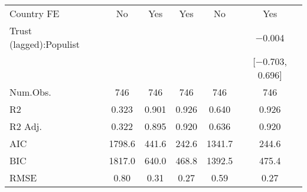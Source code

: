 \begin{table}
\begin{tabular}[t]{lccccc}
Country FE & No & Yes & Yes & No & Yes\\
Trust (lagged):Populist &  &  &  &  & \num{-0.004}\\
 &  &  &  &  & {}[\num{-0.703}, \num{0.696}]\\
\midrule
Num.Obs. & \num{746} & \num{746} & \num{746} & \num{746} & \num{746}\\
R2 & \num{0.323} & \num{0.901} & \num{0.926} & \num{0.640} & \num{0.926}\\
R2 Adj. & \num{0.322} & \num{0.895} & \num{0.920} & \num{0.636} & \num{0.920}\\
AIC & \num{1798.6} & \num{441.6} & \num{242.6} & \num{1341.7} & \num{244.6}\\
BIC & \num{1817.0} & \num{640.0} & \num{468.8} & \num{1392.5} & \num{475.4}\\
RMSE & \num{0.80} & \num{0.31} & \num{0.27} & \num{0.59} & \num{0.27}\\
\bottomrule
\end{tabular}
\end{table}
